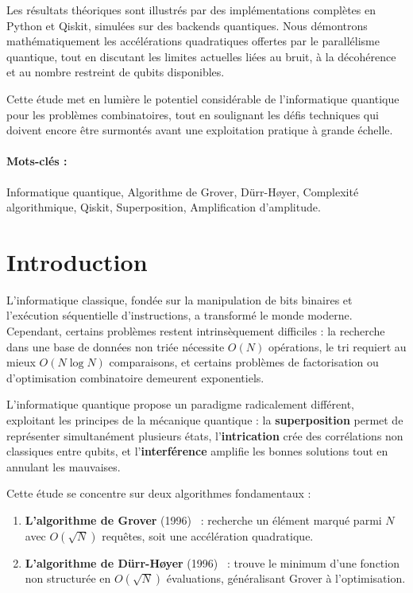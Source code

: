 \documentclass[12pt,a4paper]{article}
\theoremstyle{definition}
\theoremstyle{remark}
\begin{document}
Les résultats théoriques sont illustrés par des implémentations complètes en Python et Qiskit, simulées sur des backends quantiques. Nous démontrons mathématiquement les accélérations quadratiques offertes par le parallélisme quantique, tout en discutant les limites actuelles liées au bruit, à la décohérence et au nombre restreint de qubits disponibles.

Cette étude met en lumière le potentiel considérable de l'informatique quantique pour les problèmes combinatoires, tout en soulignant les défis techniques qui doivent encore être surmontés avant une exploitation pratique à grande échelle.

\paragraph{Mots-clés :} Informatique quantique, Algorithme de Grover, Dürr-Høyer, Complexité algorithmique, Qiskit, Superposition, Amplification d'amplitude.

\newpage

\section{Introduction}

L'informatique classique, fondée sur la manipulation de bits binaires et l'exécution séquentielle d'instructions, a transformé le monde moderne. Cependant, certains problèmes restent intrinsèquement difficiles : la recherche dans une base de données non triée nécessite $O(N)$ opérations, le tri requiert au mieux $O(N \log N)$ comparaisons, et certains problèmes de factorisation ou d'optimisation combinatoire demeurent exponentiels.

L'informatique quantique propose un paradigme radicalement différent, exploitant les principes de la mécanique quantique : la \textbf{superposition} permet de représenter simultanément plusieurs états, l'\textbf{intrication} crée des corrélations non classiques entre qubits, et l'\textbf{interférence} amplifie les bonnes solutions tout en annulant les mauvaises.

Cette étude se concentre sur deux algorithmes fondamentaux :
\begin{enumerate}
    \item \textbf{L'algorithme de Grover} (1996)~\cite{grover1996} : recherche un élément marqué parmi $N$ avec $O(\sqrt{N})$ requêtes, soit une accélération quadratique.
    \item \textbf{L'algorithme de Dürr-Høyer} (1996)~\cite{durr1996} : trouve le minimum d'une fonction non structurée en $O(\sqrt{N})$ évaluations, généralisant Grover à l'optimisation.
\end{enumerate}
\end{document}
